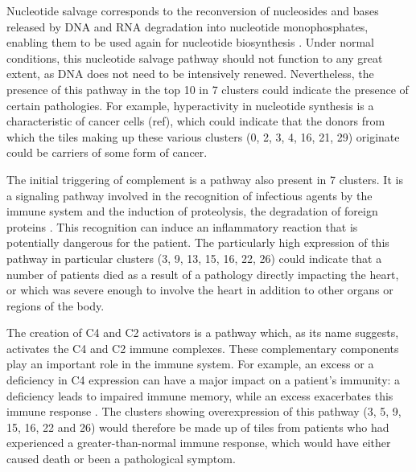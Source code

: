 \documentclass[a4paper, 11pt]{article}
\begin{document}
\begin{multicols}{2}
Nucleotide salvage corresponds to the reconversion of nucleosides and bases released by DNA and RNA degradation into nucleotide monophosphates, enabling them to be used again for nucleotide biosynthesis \citep{reactomeReactomeNucleotide}. Under normal conditions, this nucleotide salvage pathway should not function to any great extent, as DNA does not need to be intensively renewed. Nevertheless, the presence of this pathway in the top 10 in 7 clusters could indicate the presence of certain pathologies. For example, hyperactivity in nucleotide synthesis is a characteristic of cancer cells (ref), which could indicate that the donors from which the tiles making up these various clusters (0, 2, 3, 4, 16, 21, 29) originate could be carriers of some form of cancer. 

The initial triggering of complement is a pathway also present in 7 clusters. It is a signaling pathway involved in the recognition of infectious agents by the immune system and the induction of proteolysis, the degradation of foreign proteins \citep{Mullen2023}. This recognition can induce an inflammatory reaction that is potentially dangerous for the patient. The particularly high expression of this pathway in particular clusters (3, 9, 13, 15, 16, 22, 26) could indicate that a number of patients died as a result of a pathology directly impacting the heart, or which was severe enough to involve the heart in addition to other organs or regions of the body.

The creation of C4 and C2 activators is a pathway which, as its name suggests, activates the C4 and C2 immune complexes. These complementary components play an important role in the immune system. For example, an excess or a deficiency in C4 expression can have a major impact on a patient's immunity: a deficiency leads to impaired immune memory, while an excess exacerbates this immune response \citep{Blanchong2001}. The clusters showing overexpression of this pathway (3, 5, 9, 15, 16, 22 and 26) would therefore be made up of tiles from patients who had experienced a greater-than-normal immune response, which would have either caused death or been a pathological symptom.


\end{multicols}
\end{document}
